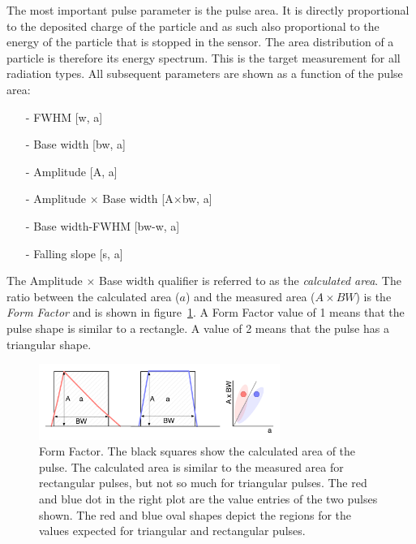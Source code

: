 The most important pulse parameter is the pulse area. It is directly proportional to the deposited charge of the particle and as such also proportional to the energy of the particle that is stopped in the sensor. The area distribution of a particle is therefore its energy spectrum. This is the target measurement for all radiation types. All subsequent parameters are shown as a function of the pulse area: 
\begin{itemize}\setlength\itemsep{0.1em}
\item[-] FWHM [w, a]
\item[-] Base width [bw, a]
\item[-] Amplitude [A, a]
\item[-] Amplitude $\times$ Base width [A$\times$bw, a]
\item[-] Base width-FWHM [bw-w, a]
\item[-] Falling slope [s, a]
\end{itemize}
The Amplitude $\times$ Base width qualifier is referred to as the \emph{calculated area}. The ratio between the calculated area ($a$) and the measured area ($A\times BW$) is the \emph{Form Factor} and is shown in figure~\ref{fig:formfac1}. A Form Factor value of 1 means that the pulse shape is similar to a rectangle. A value of 2 means that the pulse has a triangular shape. 



\begin{figure}[!t]
\centering
\includegraphics[width=0.7\textwidth]{05_current_monitoring/plots/formfac1}
\caption{Form Factor. The black squares show the calculated area of the pulse. The calculated area is similar to the measured area for rectangular pulses, but not so much for triangular pulses. The red and blue dot in the right plot are the value entries of the two pulses shown. The red and blue oval shapes depict the regions for the values expected for triangular and rectangular pulses. %
}
\label{fig:formfac1}
\end{figure}

